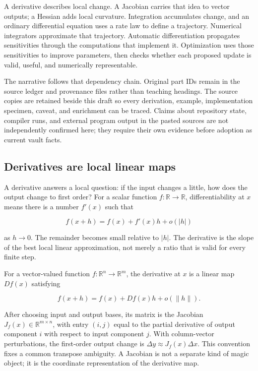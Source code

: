 A derivative describes local change. A Jacobian carries that idea to vector outputs; a Hessian adds local curvature. Integration accumulates change, and an ordinary differential equation uses a rate law to define a trajectory. Numerical integrators approximate that trajectory. Automatic differentiation propagates sensitivities through the computations that implement it. Optimization uses those sensitivities to improve parameters, then checks whether each proposed update is valid, useful, and numerically representable.

The narrative follows that dependency chain. Original part IDs remain in the source ledger and provenance files rather than teaching headings. The source copies are retained beside this draft so every derivation, example, implementation specimen, caveat, and enrichment can be traced. Claims about repository state, compiler runs, and external program output in the pasted sources are not independently confirmed here; they require their own evidence before adoption as current vault facts.

\subsection{Derivatives are local linear maps}\label{01-foundations-i-ch020-derivatives-are-local-linear-maps}

\hypertarget{01-foundations-i-ch020-derivatives-are-local-linear-maps}{}

A derivative answers a local question: if the input changes a little, how does the output change to first order? For a scalar function \(f:\mathbb R\to\mathbb R\), differentiability at \(x\) means there is a number \(f'(x)\) such that

\[
f(x+h)=f(x)+f'(x)h+o(|h|)
\]

as \(h\to0\). The remainder becomes small relative to \(|h|\). The derivative is the slope of the best local linear approximation, not merely a ratio that is valid for every finite step.

For a vector-valued function \(f:\mathbb R^n\to\mathbb R^m\), the derivative at \(x\) is a linear map \(Df(x)\) satisfying

\[
f(x+h)=f(x)+Df(x)h+o(\|h\|).
\]

After choosing input and output bases, its matrix is the Jacobian \(J_f(x)\in\mathbb R^{m\times n}\), with entry \((i,j)\) equal to the partial derivative of output component \(i\) with respect to input component \(j\). With column-vector perturbations, the first-order output change is \(\Delta y\approx J_f(x)\Delta x\). This convention fixes a common transpose ambiguity. A Jacobian is not a separate kind of magic object; it is the coordinate representation of the derivative map.

